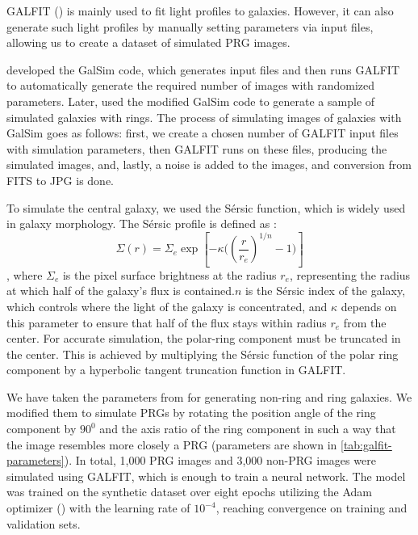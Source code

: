 \documentclass{aa}
\begin{document}
GALFIT (\cite{Peng2002}) is mainly used to fit light profiles to galaxies. However, it can also generate such light profiles by manually setting parameters via input files, allowing us to create a dataset of simulated PRG images. 

\cite{Ghosh2020} developed the GalSim code, which generates input files and then runs GALFIT to automatically generate the required number of images with randomized parameters. Later, \cite{Krishnakumar2022} used the modified GalSim code to generate a sample of simulated galaxies with rings. The process of simulating images of galaxies with GalSim goes as follows: first, we create a chosen number of GALFIT input files with simulation parameters, then GALFIT runs on these files, producing the simulated images, and, lastly, a noise is added to the images, and conversion from FITS to JPG is done.

To simulate the central galaxy, we used the Sérsic function, which is widely used in galaxy morphology. The Sérsic profile is defined as \citep{Peng2002}: 
$$ \Sigma(r) = \Sigma_e \exp \left[ -\kappa \Biggl( 
\left( \frac{r}{r_e}\right)^{1/n} - 1\Biggr) \right]$$,
where $\Sigma_e$ is the pixel surface brightness at the radius $r_e$, representing the radius at which half of the galaxy's flux is contained.$n$ is the Sérsic index of the galaxy, which controls where the light of the galaxy is concentrated, and $\kappa$ depends on this parameter to ensure that half of the flux stays within radius $r_e$ from the center. For accurate simulation, the polar-ring component must be truncated in the center. This is achieved by multiplying the Sérsic function of the polar ring component by a hyperbolic tangent truncation function in GALFIT. 

We have taken the parameters from \cite{Krishnakumar2022} for generating non-ring and ring galaxies. We modified them to simulate PRGs by rotating the position angle of the ring component by $90^{0}$ and the axis ratio of the ring component in such a way that the image resembles more closely a PRG (parameters are shown in \autoref{tab:galfit-parameters}). In total, 1,000 PRG images and 3,000 non-PRG images were simulated using GALFIT, which is enough to train a neural network. The model was trained on the synthetic dataset over eight epochs utilizing the Adam optimizer (\cite{Kingma2015}) with the learning rate of $10^{-4}$, reaching convergence on training and validation sets. 
\end{document}
